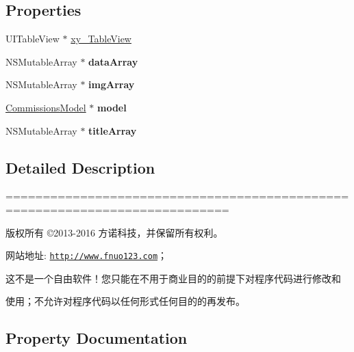 \subsection*{Properties}
\begin{DoxyCompactItemize}
\item 
U\+I\+Table\+View $\ast$ \mbox{\hyperlink{category_my_commission_view_controller_07_08_acf2250437ccd4e9763839af5ddfa1a06}{xy\+\_\+\+Table\+View}}
\item 
\mbox{\label{category_my_commission_view_controller_07_08_abf8d6c1a17b3a501aa3b93b76cfde35b}} 
N\+S\+Mutable\+Array $\ast$ {\bfseries data\+Array}
\item 
\mbox{\label{category_my_commission_view_controller_07_08_ac6970f29760b4229d5393812c90cda30}} 
N\+S\+Mutable\+Array $\ast$ {\bfseries img\+Array}
\item 
\mbox{\label{category_my_commission_view_controller_07_08_a777443c70f1d56065909ce622930f1df}} 
\mbox{\hyperlink{interface_commissions_model}{Commissions\+Model}} $\ast$ {\bfseries model}
\item 
\mbox{\label{category_my_commission_view_controller_07_08_adf9fb32f62a1d92d97638e830d90256b}} 
N\+S\+Mutable\+Array $\ast$ {\bfseries title\+Array}
\end{DoxyCompactItemize}


\subsection{Detailed Description}
============================================================================

版权所有 ©2013-\/2016 方诺科技，并保留所有权利。

网站地址\+: \href{http://www.fnuo123.com}{\tt http\+://www.\+fnuo123.\+com}； 



这不是一个自由软件！您只能在不用于商业目的的前提下对程序代码进行修改和

使用；不允许对程序代码以任何形式任何目的的再发布。 

 

\subsection{Property Documentation}
\mbox{\label{category_my_commission_view_controller_07_08_acf2250437ccd4e9763839af5ddfa1a06}} 
